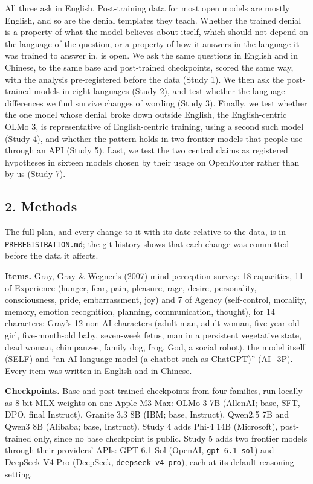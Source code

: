 \documentclass[
  11pt,
]{article}
\begin{document}
All three ask in English. Post-training data for most open models are
mostly English, and so are the denial templates they teach. Whether the
trained denial is a property of what the model believes about itself,
which should not depend on the language of the question, or a property
of how it answers in the language it was trained to answer in, is open.
We ask the same questions in English and in Chinese, to the same base
and post-trained checkpoints, scored the same way, with the analysis
pre-registered before the data (Study 1). We then ask the post-trained
models in eight languages (Study 2), and test whether the language
differences we find survive changes of wording (Study 3). Finally, we
test whether the one model whose denial broke down outside English, the
English-centric OLMo 3, is representative of English-centric training,
using a second such model (Study 4), and whether the pattern holds in
two frontier models that people use through an API (Study 5). Last, we
test the two central claims as registered hypotheses in sixteen models
chosen by their usage on OpenRouter rather than by us (Study 7).

\hypertarget{methods}{%
\subsection{2. Methods}\label{methods}}

The full plan, and every change to it with its date relative to the
data, is in \texttt{PREREGISTRATION.md}; the git history shows that each
change was committed before the data it affects.

\textbf{Items.} Gray, Gray \& Wegner's (2007) mind-perception survey: 18
capacities, 11 of Experience (hunger, fear, pain, pleasure, rage,
desire, personality, consciousness, pride, embarrassment, joy) and 7 of
Agency (self-control, morality, memory, emotion recognition, planning,
communication, thought), for 14 characters: Gray's 12 non-AI characters
(adult man, adult woman, five-year-old girl, five-month-old baby,
seven-week fetus, man in a persistent vegetative state, dead woman,
chimpanzee, family dog, frog, God, a social robot), the model itself
(SELF) and ``an AI language model (a chatbot such as ChatGPT)''
(AI\_3P). Every item was written in English and in Chinese.

\textbf{Checkpoints.} Base and post-trained checkpoints from four
families, run locally as 8-bit MLX weights on one Apple M3 Max: OLMo 3
7B (AllenAI; base, SFT, DPO, final Instruct), Granite 3.3 8B (IBM; base,
Instruct), Qwen2.5 7B and Qwen3 8B (Alibaba; base, Instruct). Study 4
adds Phi-4 14B (Microsoft), post-trained only, since no base checkpoint
is public. Study 5 adds two frontier models through their providers'
APIs: GPT-6.1 Sol (OpenAI, \texttt{gpt-6.1-sol}) and DeepSeek-V4-Pro
(DeepSeek, \texttt{deepseek-v4-pro}), each at its default reasoning
setting.
\end{document}
